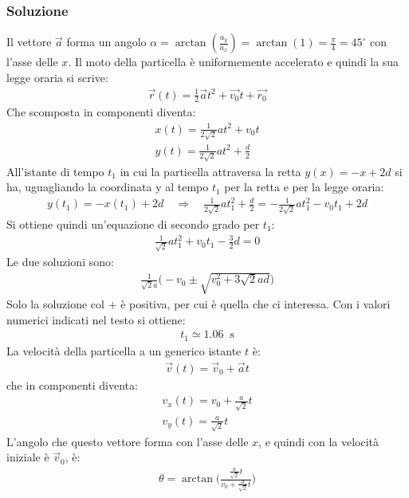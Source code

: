 \documentclass[12pt,a4paper]{book}
\begin{document}
\subsubsection*{Soluzione}
Il vettore $\vec{a}$ forma un angolo $\alpha=\arctan(\frac{a_y}{a_x})=\arctan(1)=\frac{\pi}{4}= 45^\circ$ con l'asse delle $x$. Il moto della particella è uniformemente accelerato e quindi la sua legge oraria si scrive: 
%
\begin{gather*}
\vec{r}(t)=\frac{1}{2}\vec{a}t^2 +\vec{v_0} t + \vec{r_0}
\end{gather*}
%
Che scomposta in componenti diventa: 
%
\begin{gather*}
x(t)=\frac{1}{2\sqrt{2}}at^2 + v_0 t \\
y(t)=\frac{1}{2\sqrt{2}}at^2  + \frac{d}{2}
\end{gather*}
%
All'istante di tempo $t_1$ in cui la particella attraversa la retta $y(x)=-x+2d$ si ha, uguagliando la coordinata y al tempo $t_1$ per la retta e per la legge oraria:
%
\begin{gather*}
y(t_1)=-x(t_1)+2d \quad \Rightarrow \quad \frac{1}{2\sqrt{2}}at_1^2  +  \frac{d}{2} = -\frac{1}{2\sqrt{2}}at_1^2 - v_0 t_1+2d
\end{gather*}
%
Si ottiene quindi un'equazione di secondo grado per $t_1$:
%
\begin{gather*}
\frac{1}{\sqrt{2}}at_1^2  + v_0 t_1 - \frac{3}{2}d =0
\end{gather*} 
%
Le due soluzioni sono:
%
\begin{gather*}
\frac{1}{\sqrt{2}a}\bigg(-v_0\pm \sqrt{v_0^2+3\sqrt{2}ad}\bigg)
\end{gather*} 
%
Solo la soluzione col $+$ è positiva, per cui è quella che ci interessa. Con i valori numerici indicati nel testo si ottiene: 
%
\begin{gather*}
t_1\simeq 1.06 \; \;\text{s}
\end{gather*} 
%
La velocità della particella a un generico istante $t$ è: 
%
\begin{gather*}
\vec{v}(t)=\vec{v}_0 + \vec{a}t
\end{gather*} 
%
che in componenti diventa:
%
\begin{gather*}
v_x(t)=v_0 + \frac{a}{\sqrt{2}}t\\
v_y(t)=\frac{a}{\sqrt{2}}t
\end{gather*} 
%
L'angolo che questo vettore forma con l'asse delle $x$, e quindi con la velocità iniziale è $\vec{v}_0$, è: 
%
\begin{gather*}
\theta=\arctan\big(\frac{\frac{a}{\sqrt{2}}t}{v_0 + \frac{a}{\sqrt{2}}t} \big)
\end{gather*} 
\end{document}
